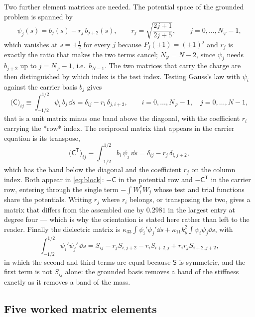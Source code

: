 Two further element matrices are needed.  The potential space of the grounded
problem is spanned by
\begin{equation}
\label{eq:app_pot}
\psi_j(s)=b_j(s)-r_j\,b_{j+2}(s),\qquad
r_j=\sqrt{\frac{2j+1}{2j+5}},\qquad j=0,\dots,N_\varphi-1 ,
\end{equation}
which vanishes at $s=\pm\tfrac12$ for every $j$ because $P_j(\pm1)=(\pm1)^j$ and
$r_j$ is exactly the ratio that makes the two terms cancel; $N_\varphi=N-2$,
since $\psi_j$ needs $b_{j+2}$ up to $j=N_\varphi-1$, i.e.\ $b_{N-1}$.  The two
matrices that carry the charge are then distinguished by which index is the test
index.  Testing Gauss's law with $\psi_i$ against the carrier basis $b_j$ gives
\begin{equation}
\label{eq:app_charge}
\bigl(\mathsf C\bigr)_{ij}\equiv\int_{-1/2}^{1/2}\psi_i\,b_j\,\dd s
=\delta_{ij}-r_i\,\delta_{j,i+2},
\qquad i=0,\dots,N_\varphi-1,\quad j=0,\dots,N-1 ,
\end{equation}
that is a unit matrix minus one band above the diagonal, with the coefficient
$r_i$ carrying the *row* index.  The reciprocal matrix that appears in the
carrier equation is its transpose,
\begin{equation}
\label{eq:app_charge_T}
\bigl(\mathsf C^{\mathsf T}\bigr)_{ij}\equiv\int_{-1/2}^{1/2}b_i\,\psi_j\,\dd s
=\delta_{ij}-r_j\,\delta_{i,j+2},
\end{equation}
which has the band below the diagonal and the coefficient $r_j$ on the column
index.  Both appear in \eqref{eq:block}: $-\mathsf C$ in the potential row and
$-\mathsf C^{\mathsf T}$ in the carrier row, entering through the single term
$-\int W_i^{*}W_j$ whose test and trial functions share the potentials.  Writing
$r_j$ where $r_i$ belongs, or transposing the two, gives a matrix that differs
from the assembled one by $0.2981$ in the largest entry at degree four --- which
is why the orientation is stated here rather than left to the reader.  Finally
the dielectric matrix is
$\kappa_{33}\int\psi_i'\psi_j'\dd s+\kappa_{11}k_y^{2}\int\psi_i\psi_j\dd s$,
with
\begin{equation}
\label{eq:app_diel}
\int_{-1/2}^{1/2}\psi_i'\psi_j'\,\dd s
=S_{ij}-r_jS_{i,j+2}-r_iS_{i+2,j}+r_ir_jS_{i+2,j+2},
\end{equation}
in which the second and third terms are equal because $\mathsf S$ is symmetric,
and the first term is not $S_{ij}$ alone: the grounded basis removes a band of
the stiffness exactly as it removes a band of the mass.

\subsection{Five worked matrix elements}

